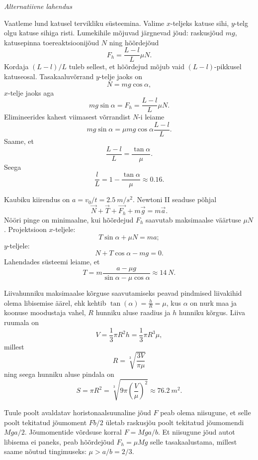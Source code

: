 \documentclass[10pt, twoside]{article}
\begin{document}
{\vspace{0.5\baselineskip}

\emph{Alternatiivne lahendus}

Vaatleme lund katusel tervikliku süsteemina. Valime $x$-teljeks katuse sihi, $y$-telg olgu katuse sihiga risti. Lumekihile mõjuvad järgnevad jõud: raskusjõud $mg$, katusepinna toereaktsioonijõud $N$ ning hõõrdejõud
\[
F_h = \frac{L-l}{L} \mu N.
\]
Kordaja $(L-l)/L$ tuleb sellest, et hõõrdejud mõjub vaid $(L-l)$-pikkusel katuseosal.
Tasakaaluvõrrand $y$-telje jaoks on
\[
N = mg \cos \alpha,
\]
$x$-telje jaoks aga
\[
m g \sin \alpha=F_{h}=\frac{L-l}{L} \mu N.
\]
Elimineerides kahest viimasest võrrandist $N$-i leiame
\[
m g \sin \alpha=\mu m g \cos \alpha \frac{L-l}{L}.
\]
Saame, et
\[
\frac{L-l}{L} = \frac{\tan\alpha}{\mu}.
\]
Seega
\[
\frac{l}{L}=1-\frac{\tan \alpha}{\mu} \approx \num{0,16}.
\]
\probend
\bigskip


\solu
Kaubiku kiirendus on $a=v_0/t=\SI{2.5}{m/s^2}$. Newtoni II seaduse põhjal
\[
\vec{N}+\vec{T}+\vec{F_h}+m\vec{g}=m\vec{a}.
\]
Nööri pinge on minimaalne, kui hõõrdejud $F_h$ saavutab maksimaalse väärtuse $\mu N$. Projektsioon $x$-teljele:
\[
T\sin\alpha+\mu N=ma;
\]
$y$-teljele:
\[
N+T\cos\alpha-mg=0.
\]
Lahendades süsteemi leiame, et
\[
T=m\frac{a-\mu g}{\sin\alpha-\mu\cos\alpha} \approx \SI{14}{N}.
\]
\probend
\bigskip


\solu
Liivahunniku maksimaalse kõrguse saavutamiseks peavad pindmised liivakihid olema libisemise äärel, ehk kehtib $\tan (\alpha)=\frac{h}{R}=\mu$, kus $\alpha$ on nurk maa ja koonuse moodustaja vahel, $R$ hunniku aluse raadius ja $h$ hunniku kõrgus. Liiva ruumala on
\[
V=\frac{1}{3} \pi R^{2} h=\frac{1}{3} \pi R^{3} \mu,
\]
millest 
\[
R=\sqrt[3]{\frac{3 V}{\pi \mu}}
\]
ning seega hunniku aluse pindala on
\[
S=\pi R^{2}=\sqrt[3]{9 \pi\left(\frac{V}{\mu}\right)^{2}} \approx \SI{76.2}{m^2}.
\]
\probend
\bigskip


\solu
Tuule poolt avaldatav horistonaalsuunaline jõud $F$ peab olema niisugune, et selle poolt tekitatud jõumoment $Fb/2$ ületab raskusjõu poolt tekitatud jõumomendi $Mga/2$. Jõumomentide võrdsuse korral $F=Mga/b$. Et niisugune jõud autot libisema ei paneks, peab hõõrdejõud $F_h=\mu Mg$ selle tasakaalustama, millest saame nõutud tingimuseks: $\mu > a/b = 2/3$.
\probend
\bigskip

}
\end{document}
